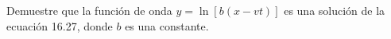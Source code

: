 \item Demuestre que la función de onda $y = \ln [b(x - vt)]$ es una solución de la ecuación 16.27, donde $b$ es una constante.